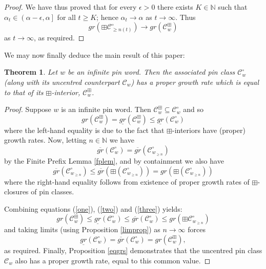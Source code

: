 \documentclass[11pt,a4paper]{article}
\newtheorem{thm}{Theorem}[section]
\theoremstyle{definition}
\begin{document}
\begin{proof}
We have thus proved that for every $\epsilon > 0$ there exists $K \in \mathbb{N}$ such that $\alpha_{t} \in \left(\alpha - \epsilon, \alpha\right]$ for all $t \geq K$; hence $\alpha_{t} \rightarrow \alpha$ as $t \rightarrow \infty$. Thus
\[
gr(\boxplus\mathcal{C}^{\circ}_{\geq n(t)}) \rightarrow gr(\mathcal{C}^{\boxplus}_{w})
\]
as $t\rightarrow\infty$, as required. \qedhere \end{proof}

We may now finally deduce the main result of this paper:

\begin{thm} \label{greqbox}
Let $w$ be an infinite pin word. Then the associated pin class $\mathcal{C}^{\circ}_{w}$ (along with its uncentred counterpart $\mathcal{C}_{w}$) has a proper growth rate which is equal to that of its $\boxplus$-interior, $\mathcal{C}^{\boxplus}_{w}$.
\end{thm}

\begin{proof}
Suppose $w$ is an infinite pin word. Then $\mathcal{C}^{\boxplus}_{w} \subseteq \mathcal{C}^{\circ}_{w}$ and so
\begin{equation}\label{one}
gr(\mathcal{C}^{\boxplus}_{w}) =  \underline{gr}(\mathcal{C}^{\boxplus}_{w}) \leq \underline{gr}(\mathcal{C}^{\circ}_{w})
\end{equation}
where the left-hand equality is due to the fact that $\boxplus$-interiors have (proper) growth rates. Now, letting $n \in \mathbb{N}$ we have
\begin{equation}\label{two}
\overline{gr}(\mathcal{C}^{\circ}_{w}) = \overline{gr}(\mathcal{C}^{\circ}_{w_{\geq n}})
\end{equation}
by the Finite Prefix Lemma \ref{fplem}, and by containment we also have
\begin{equation} \label{three}
\overline{gr}(\mathcal{C}^{\circ}_{w_{\geq n}}) \leq \overline{gr}(\boxplus(\mathcal{C}^{\circ}_{w_{\geq n}})) = gr(\boxplus(\mathcal{C}^{\circ}_{w_{\geq n}}))
\end{equation}
where the right-hand equality follows from existence of proper growth rates of $\boxplus$-closures of pin classes.

Combining equations (\ref{one}), (\ref{two}) and (\ref{three}) yields:
\[
gr(\mathcal{C}^{\boxplus}_{w}) \leq \underline{gr}(\mathcal{C}^{\circ}_{w}) \leq \overline{gr}(\mathcal{C}^{\circ}_{w}) \leq gr(\boxplus\mathcal{C}^{\circ}_{w_{\geq n}})
\]
and taking limits (using Proposition \ref{limprop}) as $n \rightarrow \infty$ forces
\[
\underline{gr}(\mathcal{C}^{\circ}_{w}) = \overline{gr}(\mathcal{C}^{\circ}_{w}) = gr(\mathcal{C}^{\boxplus}_{w}),
\]
as required. Finally, Proposition \ref{eqgrs} demonstrates that the uncentred pin class $\mathcal{C}_{w}$ also has a proper growth rate, equal to this common value.\end{proof}
\end{document}
